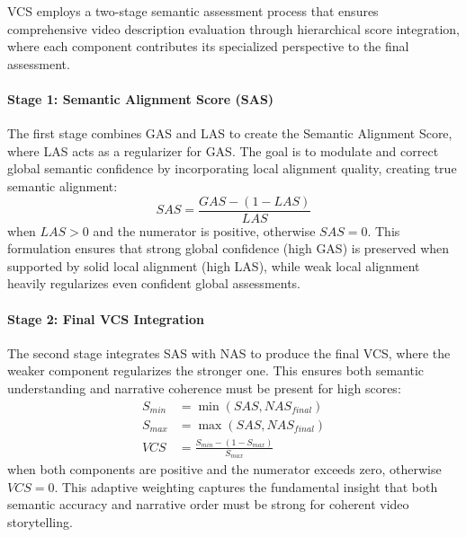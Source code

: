 \documentclass[main.tex]{subfiles}
\begin{document}
VCS employs a two-stage semantic assessment process that ensures comprehensive video description evaluation through hierarchical score integration, where each component contributes its specialized perspective to the final assessment.

\paragraph{Stage 1: Semantic Alignment Score (SAS)}
The first stage combines GAS and LAS to create the Semantic Alignment Score, where LAS acts as a regularizer for GAS. The goal is to modulate and correct global semantic confidence by incorporating local alignment quality, creating true semantic alignment:
\begin{equation} \label{eq:sas_revised} 
SAS = \frac{GAS - (1 - LAS)}{LAS}
\end{equation}
when $LAS > 0$ and the numerator is positive, otherwise $SAS = 0$. This formulation ensures that strong global confidence (high GAS) is preserved when supported by solid local alignment (high LAS), while weak local alignment heavily regularizes even confident global assessments.

\paragraph{Stage 2: Final VCS Integration}
The second stage integrates SAS with NAS to produce the final VCS, where the weaker component regularizes the stronger one. This ensures both semantic understanding and narrative coherence must be present for high scores:
\begin{align}
S_{min} &= \min(SAS, NAS_{final}) \label{eq:s_min} \\
S_{max} &= \max(SAS, NAS_{final}) \label{eq:s_max} \\
VCS &= \frac{S_{min} - (1 - S_{max})}{S_{max}} \label{eq:vcs_final}
\end{align}
when both components are positive and the numerator exceeds zero, otherwise $VCS = 0$. This adaptive weighting captures the fundamental insight that both semantic accuracy and narrative order must be strong for coherent video storytelling.
\end{document}
